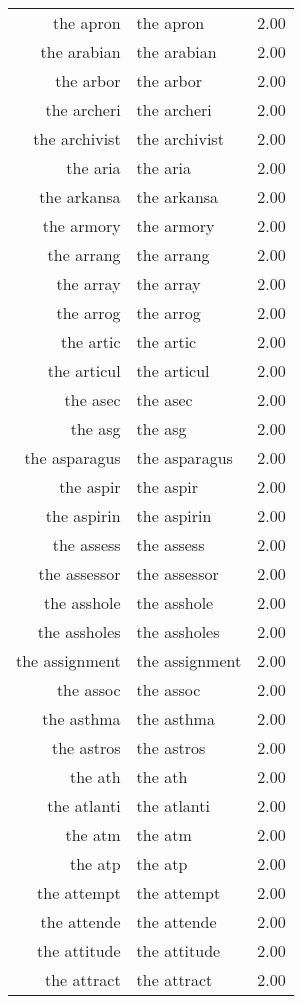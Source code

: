 \begin{table}[ht]
\begin{tabular}{rlr}
  the apron & the apron & 2.00 \\ 
  the arabian & the arabian & 2.00 \\ 
  the arbor & the arbor & 2.00 \\ 
  the archeri & the archeri & 2.00 \\ 
  the archivist & the archivist & 2.00 \\ 
  the aria & the aria & 2.00 \\ 
  the arkansa & the arkansa & 2.00 \\ 
  the armory & the armory & 2.00 \\ 
  the arrang & the arrang & 2.00 \\ 
  the array & the array & 2.00 \\ 
  the arrog & the arrog & 2.00 \\ 
  the artic & the artic & 2.00 \\ 
  the articul & the articul & 2.00 \\ 
  the asec & the asec & 2.00 \\ 
  the asg & the asg & 2.00 \\ 
  the asparagus & the asparagus & 2.00 \\ 
  the aspir & the aspir & 2.00 \\ 
  the aspirin & the aspirin & 2.00 \\ 
  the assess & the assess & 2.00 \\ 
  the assessor & the assessor & 2.00 \\ 
  the asshole & the asshole & 2.00 \\ 
  the assholes & the assholes & 2.00 \\ 
  the assignment & the assignment & 2.00 \\ 
  the assoc & the assoc & 2.00 \\ 
  the asthma & the asthma & 2.00 \\ 
  the astros & the astros & 2.00 \\ 
  the ath & the ath & 2.00 \\ 
  the atlanti & the atlanti & 2.00 \\ 
  the atm & the atm & 2.00 \\ 
  the atp & the atp & 2.00 \\ 
  the attempt & the attempt & 2.00 \\ 
  the attende & the attende & 2.00 \\ 
  the attitude & the attitude & 2.00 \\ 
  the attract & the attract & 2.00 \\ 

\end{tabular}
\end{table}

